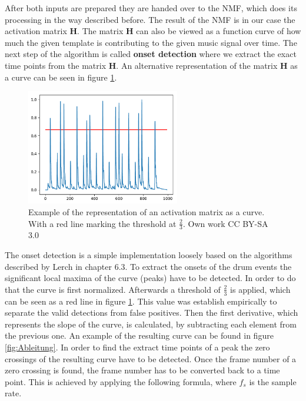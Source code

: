 \documentclass{article}
\begin{document}
After both inputs are prepared they are handed over to the NMF, which does its processing in the way described before.
The result of the NMF is in our case the activation matrix $\mathbf{H}$.
The matrix $\mathbf{H}$ can also be viewed as a function curve of how much the given template is contributing to the given music signal over time.
The next step of the algorithm is called \textbf{onset detection} where we extract the exact time points from the matrix $\mathbf{H}$.
An alternative representation of the matrix $\mathbf{H}$ as a curve can be seen in figure \ref{fig:ActivationMatrix}.
\begin{figure}[htb]

\begin{minipage}[b]{1.0\linewidth}
  \centering
  \centerline{\includegraphics[width=6.7cm]{figures/ActivationMatrix}}
  \medskip
\end{minipage}

\caption{Example of the representation of an activation matrix as a curve. With a red line marking the threshold at $\frac{2}{3}$. \scriptsize{\textsf{\textcopyright} Own work CC BY-SA 3.0}}
\label{fig:ActivationMatrix}

\end{figure}
The onset detection is a simple implementation loosely based on the algorithms described by Lerch \cite{lerch2012book} in chapter 6.3.
To extract the onsets of the drum events the significant local maxima of the curve (peaks) have to be detected.
In order to do that the curve is first normalized.
Afterwards a threshold of $\frac{2}{3}$ is applied, which can be seen as a red line in figure \ref{fig:ActivationMatrix}.
This value was establish empirically to separate the valid detections from false positives.
Then the first derivative, which represents the slope of the curve, is calculated, by subtracting each element from the previous one.
An example of the resulting curve can be found in figure \ref{fig:Ableitung}.
In order to find the extract time points of a peak the zero crossings of the resulting curve have to be detected.
Once the frame number of a zero crossing is found, the frame number has to be converted back to a time point.
This is achieved by applying the following formula, where $f_s$ is the sample rate.
\end{document}
